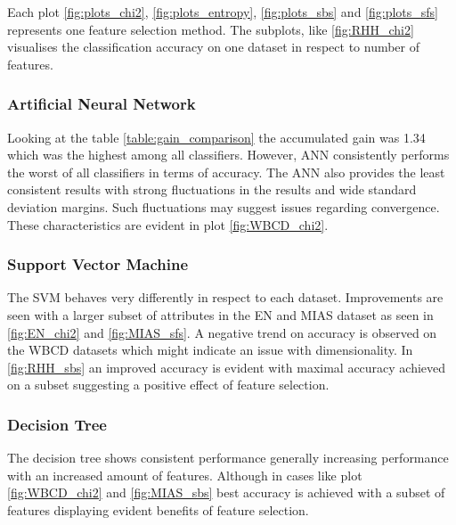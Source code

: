 Each plot \ref{fig:plots_chi2}, \ref{fig:plots_entropy}, \ref{fig:plots_sbs} and \ref{fig:plots_sfs} represents one feature selection method. The subplots, like \ref{fig:RHH_chi2} visualises the classification accuracy on one dataset in respect to number of features.

\begin{table}[hp]
  
  \caption[]%
  {{\small Ranking of which classifiers gained most accuracy when comparing feature selection to full dataset.}}
  \label{table:gain_comparison}
\end{table}

\subsubsection{Artificial Neural Network}

Looking at the table \ref{table:gain_comparison} the accumulated gain was 1.34 which was the highest among all classifiers. However, ANN consistently performs the worst of all classifiers in terms of accuracy. The ANN also provides the least consistent results with strong fluctuations in the results and wide standard deviation margins. Such fluctuations may suggest issues regarding convergence. These characteristics are evident in plot \ref{fig:WBCD_chi2}.



\subsubsection{Support Vector Machine}

The SVM behaves very differently in respect to each dataset. Improvements are seen with a larger subset of attributes in the EN and MIAS dataset as seen in \ref{fig:EN_chi2} and \ref{fig:MIAS_sfs}. A negative trend on accuracy is observed on the WBCD datasets which might indicate an issue with dimensionality. In \ref{fig:RHH_sbs} an improved accuracy is evident with maximal accuracy achieved on a subset suggesting a positive effect of feature selection.



\subsubsection{Decision Tree}

The decision tree shows consistent performance generally increasing performance with an increased amount of features. Although in cases like plot \ref{fig:WBCD_chi2} and \ref{fig:MIAS_sbs} best accuracy is achieved with a subset of features displaying evident benefits of feature selection.

